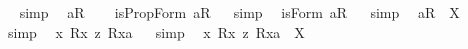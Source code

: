 \begin{isabellebody}
\isadelimproof
\ %
\endisadelimproof
%
\isatagproof
{}\isamarkupfalse%
\ simp\ \isamarkupfalse%
%
\endisatagproof
{\isafoldproof}%
%
\isadelimproof
%
\endisadelimproof
\isanewline
\isanewline
{}\isamarkupfalse%
\ {\isachardoublequoteopen}{\isacharbrackleft}{\isacharless}a{\isasymcirc}R{}{\isachargreater}{\isacharbrackright}{\isachardoublequoteclose}\ \isamarkupfalse%
%
\isadelimproof
\ %
\endisadelimproof
%
\isatagproof
{}\isamarkupfalse%
%
\endisatagproof
{\isafoldproof}%
%
\isadelimproof
%
\endisadelimproof
\isanewline
{}\isamarkupfalse%
\ {\isachardoublequoteopen}isPropForm\ {\isacharless}a{\isasymcirc}R{}{\isachargreater}{\isachardoublequoteclose}%
\isadelimproof
\ %
\endisadelimproof
%
\isatagproof
{}\isamarkupfalse%
\ simp\ \isamarkupfalse%
%
\endisatagproof
{\isafoldproof}%
%
\isadelimproof
%
\endisadelimproof
\isanewline
{}\isamarkupfalse%
\ {\isachardoublequoteopen}isForm\ {\isacharless}a{\isasymcirc}R{}{\isachargreater}{\isachardoublequoteclose}%
\isadelimproof
\ %
\endisadelimproof
%
\isatagproof
{}\isamarkupfalse%
\ simp\ \isamarkupfalse%
%
\endisatagproof
{\isafoldproof}%
%
\isadelimproof
%
\endisadelimproof
\isanewline
{}\isamarkupfalse%
\ {\isachardoublequoteopen}{\isacharless}a{\isasymcirc}R{}{\isachargreater}\ {\isacharequal}\ X{\isachardoublequoteclose}%
\isadelimproof
\ %
\endisadelimproof
%
\isatagproof
{}\isamarkupfalse%
\ simp\ \isamarkupfalse%
%
\endisatagproof
{\isafoldproof}%
%
\isadelimproof
%
\endisadelimproof
\isanewline
\isanewline
{}\isamarkupfalse%
\ {\isachardoublequoteopen}{\isacharbrackleft}{\isacharless}{\isasymlambda}x{\isachardot}\ {\isacharless}R{}{\isasymbullet}{\isachardot}x{\isachardot}{\isachargreater}\ {\isasymrightarrow}\isactrlsup z\ {\isacharless}R{}{\isasymbullet}{\isachardot}x{\isachardot}{\isachargreater}{\isacharparenright}{\isasymbullet}a{\isachargreater}{\isacharbrackright}{\isachardoublequoteclose}%
\isadelimproof
\ %
\endisadelimproof
%
\isatagproof
{}\isamarkupfalse%
\ simp\ \isamarkupfalse%
%
\endisatagproof
{\isafoldproof}%
%
\isadelimproof
%
\endisadelimproof
\isanewline
{}\isamarkupfalse%
\ {\isachardoublequoteopen}{\isacharless}{\isasymlambda}x{\isachardot}\ {\isacharless}R{}{\isasymbullet}{\isachardot}x{\isachardot}{\isachargreater}\ {\isasymrightarrow}\isactrlsup z\ {\isacharless}R{}{\isasymbullet}{\isachardot}x{\isachardot}{\isachargreater}{\isacharparenright}{\isasymbullet}a{\isachargreater}\ {\isacharequal}\ X{\isachardoublequoteclose}%

\end{isabellebody}
